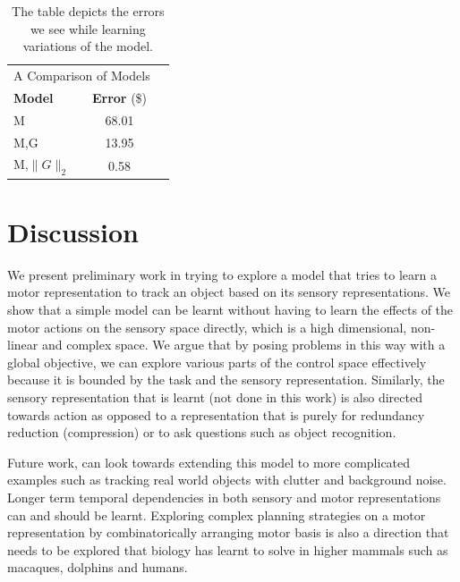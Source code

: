 \documentclass[conference]{IEEEtran}
\begin{document}
\begin{table}[htbp]
   \centering
   \begin{tabular}{@{} lcr @{}} %
      \multicolumn{2}{c}{A Comparison of Models } \\
      \textbf{Model}    & \textbf{Error} (\$)\\
      \hline
      M      & 68.01 \\                
      M,G       &  13.95 \\
      M,$\|G\|_{2}$       & 0.58 \\
      
   \end{tabular}
   \caption{The table depicts the errors we see while learning variations of the model.}
   \label{tab:booktabs}
\end{table}

\section{Discussion}

We present preliminary work in trying to explore a model that tries to learn a motor representation to track an object based on its sensory representations. We show that a simple model can be learnt without having to learn the effects of the motor actions on the sensory space directly, which is a high dimensional, non-linear and complex space. We argue that by posing problems in this way with a global objective, we can explore various parts of the control space effectively because it is bounded by the task and the sensory representation. Similarly, the sensory representation that is learnt (not done in this work) is also directed towards action as opposed to a representation that is purely for redundancy reduction (compression) or to ask questions such as object recognition.

Future work, can look towards extending this model to more complicated examples such as tracking real world objects with clutter and background noise. Longer term temporal dependencies in both sensory and motor representations can and should be learnt. Exploring complex planning strategies on a motor representation by combinatorically arranging motor basis is also a direction that needs to be explored that biology has learnt to solve in higher mammals such as macaques, dolphins and humans.
\end{document}
